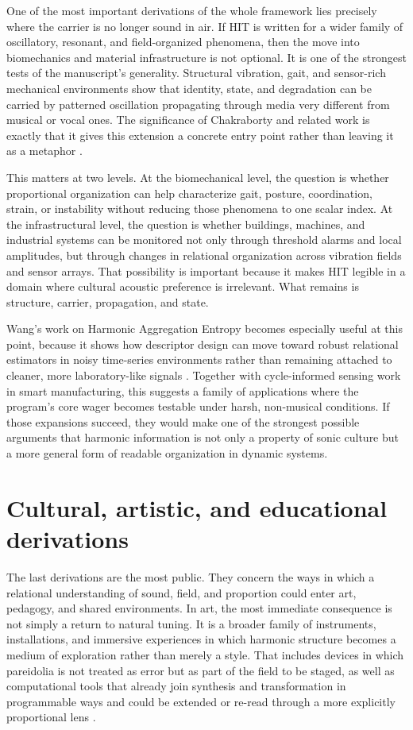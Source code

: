 One of the most important derivations of the whole framework lies precisely where the carrier is no longer sound in air. If HIT is written for a wider family of oscillatory, resonant, and field-organized phenomena, then the move into biomechanics and material infrastructure is not optional. It is one of the strongest tests of the manuscript's generality. Structural vibration, gait, and sensor-rich mechanical environments show that identity, state, and degradation can be carried by patterned oscillation propagating through media very different from musical or vocal ones. The significance of Chakraborty and related work is exactly that it gives this extension a concrete entry point rather than leaving it as a metaphor \parencite{chakraborty_2025}.

This matters at two levels. At the biomechanical level, the question is whether proportional organization can help characterize gait, posture, coordination, strain, or instability without reducing those phenomena to one scalar index. At the infrastructural level, the question is whether buildings, machines, and industrial systems can be monitored not only through threshold alarms and local amplitudes, but through changes in relational organization across vibration fields and sensor arrays. That possibility is important because it makes HIT legible in a domain where cultural acoustic preference is irrelevant. What remains is structure, carrier, propagation, and state.

Wang's work on Harmonic Aggregation Entropy becomes especially useful at this point, because it shows how descriptor design can move toward robust relational estimators in noisy time-series environments rather than remaining attached to cleaner, more laboratory-like signals \parencite{wang_haagen_2025}. Together with cycle-informed sensing work in smart manufacturing, this suggests a family of applications where the program's core wager becomes testable under harsh, non-musical conditions. If those expansions succeed, they would make one of the strongest possible arguments that harmonic information is not only a property of sonic culture but a more general form of readable organization in dynamic systems.


\section{Cultural, artistic, and educational derivations}


The last derivations are the most public. They concern the ways in which a relational understanding of sound, field, and proportion could enter art, pedagogy, and shared environments. In art, the most immediate consequence is not simply a return to natural tuning. It is a broader family of instruments, installations, and immersive experiences in which harmonic structure becomes a medium of exploration rather than merely a style. That includes devices in which pareidolia is not treated as error but as part of the field to be staged, as well as computational tools that already join synthesis and transformation in programmable ways and could be extended or re-read through a more explicitly proportional lens \parencite{engel_2020}.

